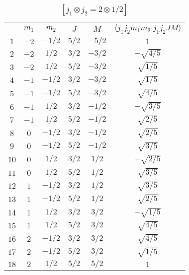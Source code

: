 \begin{table}
\tiny
\caption{$[j_1 \otimes j_2 = 2 \otimes 1/2]$}
\begin{center}
\begin{tabular}{|c|c|c|c|c|c|}
\hline 
   & $m_1$ & $m_2$ & $J$ & $M$ & $\langle j_1 j_2 m_1 m_2 | j_1 j_2 J M \rangle$ \\ 
\hline 
$1$ & $-2$ & $-1/2$ & $5/2$ & $-5/2$ & $1$ \\ 
$2$ & $-2$ & $1/2$ & $3/2$ & $-3/2$ & $-\sqrt{4/5}$ \\ 
$3$ & $-2$ & $1/2$ & $5/2$ & $-3/2$ & $\sqrt{1/5}$ \\ 
$4$ & $-1$ & $-1/2$ & $3/2$ & $-3/2$ & $\sqrt{1/5}$ \\ 
$5$ & $-1$ & $-1/2$ & $5/2$ & $-3/2$ & $\sqrt{4/5}$ \\ 
$6$ & $-1$ & $1/2$ & $3/2$ & $-1/2$ & $-\sqrt{3/5}$ \\ 
$7$ & $-1$ & $1/2$ & $5/2$ & $-1/2$ & $\sqrt{2/5}$ \\ 
$8$ & $0$ & $-1/2$ & $3/2$ & $-1/2$ & $\sqrt{2/5}$ \\ 
$9$ & $0$ & $-1/2$ & $5/2$ & $-1/2$ & $\sqrt{3/5}$ \\ 
$10$ & $0$ & $1/2$ & $3/2$ & $1/2$ & $-\sqrt{2/5}$ \\ 
$11$ & $0$ & $1/2$ & $5/2$ & $1/2$ & $\sqrt{3/5}$ \\ 
$12$ & $1$ & $-1/2$ & $3/2$ & $1/2$ & $\sqrt{3/5}$ \\ 
$13$ & $1$ & $-1/2$ & $5/2$ & $1/2$ & $\sqrt{2/5}$ \\ 
$14$ & $1$ & $1/2$ & $3/2$ & $3/2$ & $-\sqrt{1/5}$ \\ 
$15$ & $1$ & $1/2$ & $5/2$ & $3/2$ & $\sqrt{4/5}$ \\ 
$16$ & $2$ & $-1/2$ & $3/2$ & $3/2$ & $\sqrt{4/5}$ \\ 
$17$ & $2$ & $-1/2$ & $5/2$ & $3/2$ & $\sqrt{1/5}$ \\ 
$18$ & $2$ & $1/2$ & $5/2$ & $5/2$ & $1$ \\ 
\hline 
\end{tabular}
\end{center}
\end{table}

